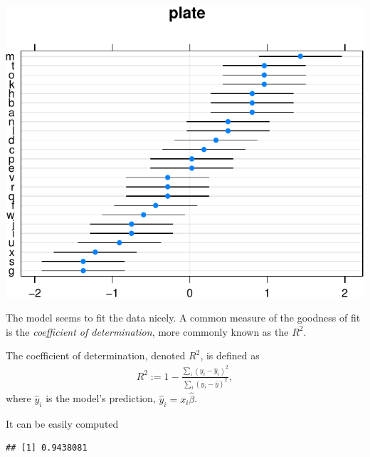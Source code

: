\documentclass[]{book}
\newenvironment{Shaded}{\begin{snugshade}}{\end{snugshade}}
\newcommand{\ControlFlowTok}[1]{\textcolor[rgb]{0.13,0.29,0.53}{\textbf{#1}}}
\newcommand{\DataTypeTok}[1]{\textcolor[rgb]{0.13,0.29,0.53}{#1}}
\newcommand{\DecValTok}[1]{\textcolor[rgb]{0.00,0.00,0.81}{#1}}
\newcommand{\FloatTok}[1]{\textcolor[rgb]{0.00,0.00,0.81}{#1}}
\newcommand{\KeywordTok}[1]{\textcolor[rgb]{0.13,0.29,0.53}{\textbf{#1}}}
\newcommand{\NormalTok}[1]{#1}
\newcommand{\OperatorTok}[1]{\textcolor[rgb]{0.81,0.36,0.00}{\textbf{#1}}}
\newcommand{\StringTok}[1]{\textcolor[rgb]{0.31,0.60,0.02}{#1}}
\theoremstyle{definition}
\theoremstyle{definition}
\theoremstyle{definition}
\theoremstyle{remark}
\let\BeginKnitrBlock\begin \let\EndKnitrBlock\end
\begin{document}
\includegraphics[width=0.5\linewidth]{Rcourse_files/figure-latex/unnamed-chunk-157-1}

The model seems to fit the data nicely.
A common measure of the goodness of fit is the \emph{coefficient of determination}, more commonly known as the \(R^2\).



\BeginKnitrBlock{definition}[R2]
\protect\hypertarget{def:unnamed-chunk-158}{}{\label{def:unnamed-chunk-158} {} }The coefficient of determination, denoted \(R^2\), is defined as
\begin{align}
  R^2:= 1-\frac{\sum_i (y_i - \hat y_i)^2}{\sum_i (y_i - \bar y)^2},
\end{align}
where \(\hat y_i\) is the model's prediction, \(\hat y_i = x_i \hat \beta\).
\EndKnitrBlock{definition}

It can be easily computed

\begin{Shaded}
\end{Shaded}

\begin{verbatim}
## [1] 0.9438081
\end{verbatim}
\end{document}
